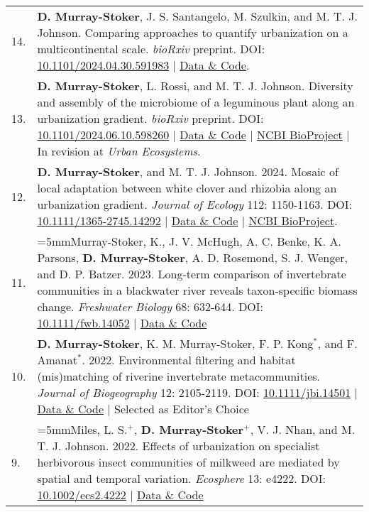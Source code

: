 \documentclass[letterpaper,11pt,oneside]{article}
\begin{document}
\def\arraystretch{1.4}
\noindent
\begin{longtable}{@{} p{0.5cm} >{\raggedright\arraybackslash}p{16.7cm}}
14. & \hangindent=5mm\textbf{D. Murray-Stoker}, J. S. Santangelo, M. Szulkin, and M. T. J. Johnson. Comparing approaches to quantify urbanization on a multicontinental scale. \textit{bioRxiv} preprint. DOI: \href{https://www.biorxiv.org/content/10.1101/2024.04.30.591983v1}{10.1101/2024.04.30.591983} | \href{https://doi.org/10.5281/zenodo.11038230}{Data \& Code}. \\
13. & \hangindent=5mm\textbf{D. Murray-Stoker},  L. Rossi, and M. T. J. Johnson. Diversity and assembly of the microbiome of a leguminous plant along an urbanization gradient. \textit{bioRxiv} preprint. DOI: \href{https://www.biorxiv.org/content/10.1101/2024.06.10.598260v1}{10.1101/2024.06.10.598260} | \href{https://zenodo.org/records/11550119}{Data \& Code} | \href{https://www.ncbi.nlm.nih.gov/bioproject/PRJNA1107685}{NCBI BioProject} | In revision at \textit{Urban Ecosystems}.\\
12. & \hangindent=5mm\textbf{D. Murray-Stoker},  and M. T. J. Johnson. 2024. Mosaic of local adaptation between white clover and rhizobia along an urbanization gradient. \textit{Journal of Ecology} 112: 1150-1163. DOI: \href{https://onlinelibrary.wiley.com/doi/abs/10.1111/1365-2745.14292}{10.1111/1365-2745.14292} | \href{https://doi.org/10.5281/zenodo.8253951}{Data \& Code} | \href{https://www.ncbi.nlm.nih.gov/bioproject/PRJNA1005557}{NCBI BioProject}. \\
11. & \hangindent=5mmMurray-Stoker, K., J. V. McHugh, A. C. Benke, K. A. Parsons, \textbf{D. Murray-Stoker}, A. D. Rosemond, S. J. Wenger, and D. P. Batzer. 2023. Long-term comparison of invertebrate communities in a blackwater river reveals taxon-specific biomass change. \textit{Freshwater Biology} 68: 632-644. DOI: {\href{https://onlinelibrary.wiley.com/doi/abs/10.1111/fwb.14052}{10.1111/fwb.14052}} | {\href{https://zenodo.org/record/7455905#.Y8F1BezMIbk}{Data \& Code}}\\
10. & \hangindent=5mm\textbf{D. Murray-Stoker}, K. M. Murray-Stoker, F. P. Kong$^{*}$, and F. Amanat$^{*}$. 2022. Environmental filtering and habitat (mis)matching of riverine invertebrate metacommunities. \textit{Journal of Biogeography} 12: 2105-2119. DOI: {\href{http://onlinelibrary.wiley.com/doi/abs/10.1111/jbi.14501}{10.1111/jbi.14501}} | {\href{https://zenodo.org/record/6800554#.Ys9CNOzML0o}{Data \& Code}} | Selected as Editor's Choice \\
9. & \hangindent=5mmMiles, L. S.$^{+}$, \textbf{D. Murray-Stoker}$^{+}$, V. J. Nhan, and M. T. J. Johnson. 2022. Effects of urbanization on specialist herbivorous insect communities of milkweed are mediated by spatial and temporal variation. \textit{Ecosphere} 13: e4222. DOI: {\href{http://onlinelibrary.wiley.com/doi/abs/10.1002/ecs2.4222}{10.1002/ecs2.4222}} | {\href{https://zenodo.org/record/6474064#.Ys9CEezML0o}{Data \& Code}} \\

\end{longtable}
\end{document}

